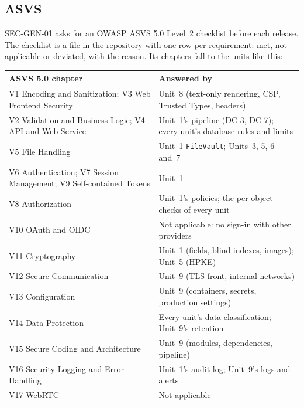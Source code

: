 \documentclass[11pt,a4paper]{article}
\newenvironment{dtable}[1]{\small\begin{longtable}{#1}}{\end{longtable}}
\begin{document}
\subsection{ASVS}
SEC-GEN-01 asks for an OWASP ASVS 5.0 Level~2 checklist before each release. The checklist is a file in the repository with one row per requirement: met, not applicable or deviated, with the reason. Its chapters fall to the units like this:
\begin{dtable}{@{}>{\raggedright\arraybackslash}p{6.0cm}>{\raggedright\arraybackslash}p{9.2cm}@{}}
\toprule
\textbf{ASVS 5.0 chapter} & \textbf{Answered by} \\ \midrule \endhead
V1 Encoding and Sanitization; V3 Web Frontend Security & Unit~8 (text-only rendering, CSP, Trusted Types, headers) \\
V2 Validation and Business Logic; V4 API and Web Service & Unit~1's pipeline (DC-3, DC-7); every unit's database rules and limits \\
V5 File Handling & Unit~1 \texttt{FileVault}; Units~3, 5, 6 and~7 \\
V6 Authentication; V7 Session Management; V9 Self-contained Tokens & Unit~1 \\
V8 Authorization & Unit~1's policies; the per-object checks of every unit \\
V10 OAuth and OIDC & Not applicable: no sign-in with other providers \\
V11 Cryptography & Unit~1 (fields, blind indexes, images); Unit~5 (HPKE) \\
V12 Secure Communication & Unit~9 (TLS front, internal networks) \\
V13 Configuration & Unit~9 (containers, secrets, production settings) \\
V14 Data Protection & Every unit's data classification; Unit~9's retention \\
V15 Secure Coding and Architecture & Unit~9 (modules, dependencies, pipeline) \\
V16 Security Logging and Error Handling & Unit~1's audit log; Unit~9's logs and alerts \\
V17 WebRTC & Not applicable \\
\bottomrule
\end{dtable}
\end{document}
